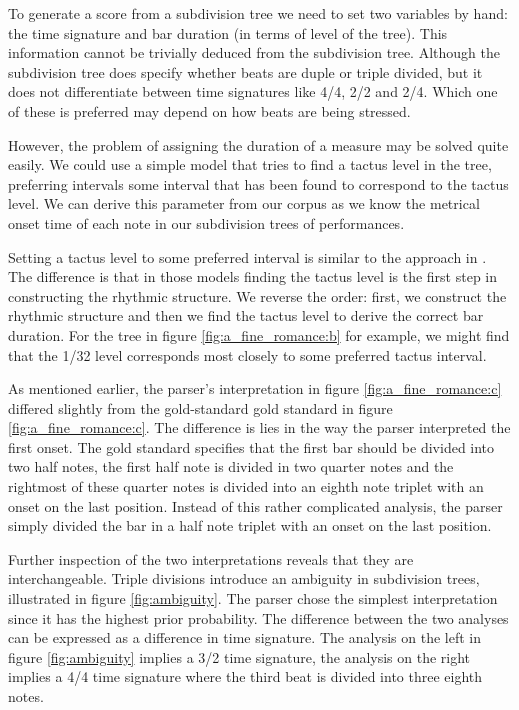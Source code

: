 To generate a score from a subdivision tree we need to set two variables by hand: the time signature and bar duration (in terms of level of the tree). This information cannot be trivially deduced from the subdivision tree. Although the subdivision tree does specify whether beats are duple or triple divided, but it does not differentiate between time signatures like 4/4, 2/2 and 2/4. Which one of these is preferred may depend on how beats are being stressed.

However, the problem of assigning the duration of a measure may be solved quite easily. We could use a simple model that tries to find a tactus level in the tree, preferring intervals some interval that has been found to correspond to the tactus level. We can derive this parameter from our corpus as we know the metrical onset time of each note in our subdivision trees of performances. 

Setting a tactus level to some preferred interval is similar to the approach in  \citet{temperley2009unified, temperley2007music}. The difference is that in those models finding the tactus level is the first step in constructing the rhythmic structure. We reverse the order: first, we construct the rhythmic structure and then we find the tactus level to derive the correct bar duration. For the tree in figure \ref{fig:a_fine_romance:b} for example, we might find that the 1/32 level corresponds most closely to some preferred tactus interval.

As mentioned earlier, the parser's interpretation in figure \ref{fig:a_fine_romance:c} differed slightly from the gold-standard gold standard in figure \ref{fig:a_fine_romance:c}. The difference is lies in the way the parser interpreted the first onset. The gold standard specifies that the first bar should be divided into two half notes, the first half note is divided in two quarter notes and the rightmost of these quarter notes is divided into an eighth note triplet with an onset on the last position. Instead of this rather complicated analysis, the parser simply divided the bar in a half note triplet with an onset on the last position. 

Further inspection of the two interpretations reveals that they are interchangeable. Triple divisions introduce an ambiguity in subdivision trees, illustrated in figure \ref{fig:ambiguity}. The parser chose the simplest interpretation since it has the highest prior probability. The difference between the two analyses can be expressed as a difference in time signature. The analysis on the left in figure \ref{fig:ambiguity} implies a 3/2 time signature, the analysis on the right implies a 4/4 time signature where the third beat is divided into three eighth notes.

